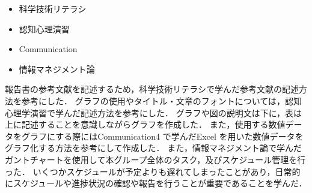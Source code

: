 \documentclass[../report]{subfiles}
\begin{document}
\begin{itemize}
    \item 科学技術リテラシ
    \item 認知心理演習
    \item Communication
    \item 情報マネジメント論
\end{itemize}

報告書の参考文献を記述するため，科学技術リテラシで学んだ参考文献の記述方法を参考にした．
グラフの使用やタイトル・文章のフォントについては，認知心理学演習で学んだ記述方法を参考にした．
グラフや図の説明文は下に，表は上に記述することを意識しながらグラフを作成した．
また，使用する数値データをグラフにする際にはCommunication4 で学んだExcel を用いた数値データをグラフ化する方法を参考にして作成した．
また，情報マネジメント論で学んだガントチャートを使用して本グループ全体のタスク，及びスケジュール管理を行った．
いくつかスケジュールが予定よりも遅れてしまったことがあり，日常的にスケジュールや進捗状況の確認や報告を行うことが重要であることを学んだ．
\end{document}
